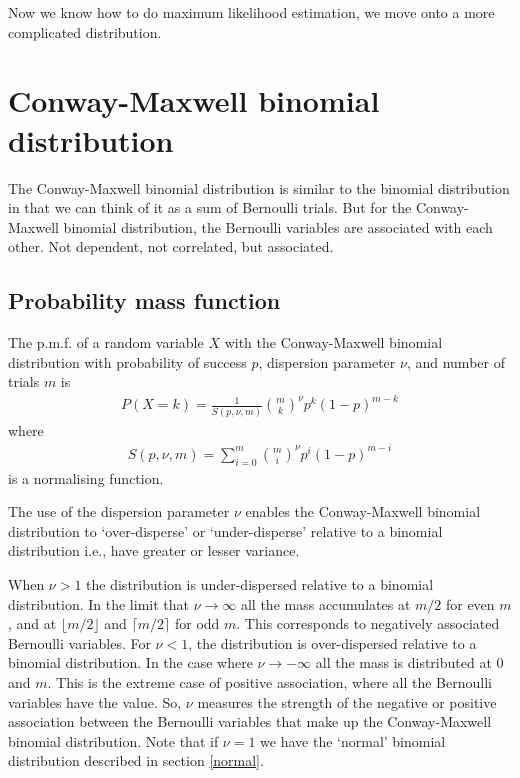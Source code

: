 \documentclass[a4paper,12pt]{article}
\theoremstyle{definition}
\begin{document}
Now we know how to do maximum likelihood estimation, we move onto a more complicated distribution.

\section{Conway-Maxwell binomial distribution}
The Conway-Maxwell binomial distribution is similar to the binomial distribution in that we can think of it as a sum of Bernoulli trials. But for the Conway-Maxwell binomial distribution, the Bernoulli variables are associated with each other. Not dependent, not correlated, but associated. 

\subsection{Probability mass function}
The p.m.f. of a random variable $X$ with the Conway-Maxwell binomial distribution with probability of success $p$, dispersion parameter $\nu$, and number of trials $m$ is
\begin{align}
  P(X = k) = \frac{1}{S(p, \nu, m)} \binom{m}{k}^{\nu} p^{k} (1-p)^{m-k}
\end{align}
where 
\begin{align}
  S(p, \nu, m) = \sum_{i=0}^{m} \binom{m}{i}^{\nu} p^{i} (1-p)^{m-i}
\end{align}
is a normalising function. 

The use of the dispersion parameter $\nu$ enables the Conway-Maxwell binomial distribution to `over-disperse' or `under-disperse' relative to a binomial distribution i.e., have greater or lesser variance.

When $\nu > 1$ the distribution is under-dispersed relative to a binomial distribution. In the limit that $\nu \rightarrow \infty$ all the mass accumulates at $m/2$ for even $m$, and at $\lfloor m/2 \rfloor$ and $\lceil m/2 \rceil$ for odd $m$. This corresponds to negatively associated Bernoulli variables. For $\nu < 1$, the distribution is over-dispersed relative to a binomial distribution. In the case where $\nu \rightarrow -\infty$ all the mass is distributed at $0$ and $m$. This is the extreme case of positive association, where all the Bernoulli variables have the value. So, $\nu$ measures the strength of the negative or positive association between the Bernoulli variables that make up the Conway-Maxwell binomial distribution. Note that if $\nu =1$ we have the `normal' binomial distribution described in section \ref{normal}.
\end{document}
